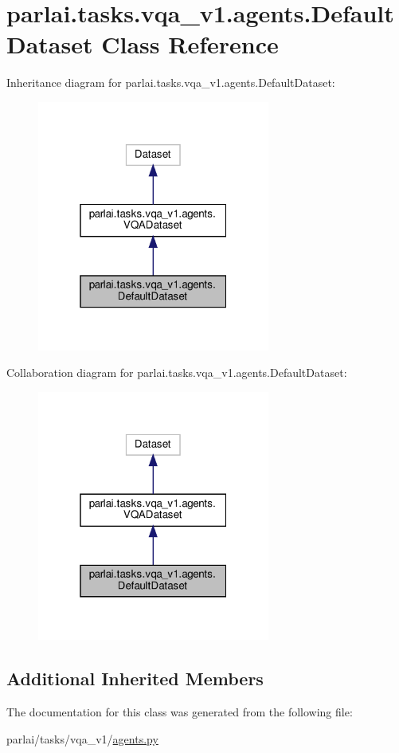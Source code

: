 \hypertarget{classparlai_1_1tasks_1_1vqa__v1_1_1agents_1_1DefaultDataset}{}\section{parlai.\+tasks.\+vqa\+\_\+v1.\+agents.\+Default\+Dataset Class Reference}
\label{classparlai_1_1tasks_1_1vqa__v1_1_1agents_1_1DefaultDataset}


Inheritance diagram for parlai.\+tasks.\+vqa\+\_\+v1.\+agents.\+Default\+Dataset\+:
\nopagebreak
\begin{figure}[H]
\begin{center}
\leavevmode
\includegraphics[width=217pt]{classparlai_1_1tasks_1_1vqa__v1_1_1agents_1_1DefaultDataset__inherit__graph}
\end{center}
\end{figure}


Collaboration diagram for parlai.\+tasks.\+vqa\+\_\+v1.\+agents.\+Default\+Dataset\+:
\nopagebreak
\begin{figure}[H]
\begin{center}
\leavevmode
\includegraphics[width=217pt]{classparlai_1_1tasks_1_1vqa__v1_1_1agents_1_1DefaultDataset__coll__graph}
\end{center}
\end{figure}
\subsection*{Additional Inherited Members}


The documentation for this class was generated from the following file\+:\begin{DoxyCompactItemize}
\item 
parlai/tasks/vqa\+\_\+v1/\hyperlink{parlai_2tasks_2vqa__v1_2agents_8py}{agents.\+py}\end{DoxyCompactItemize}
